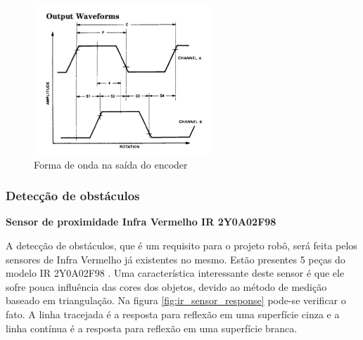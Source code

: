 \begin{figure}[H]
\centering
\includegraphics[width=0.6\textwidth]{./figuras/heds9700.png}
\caption{Forma de onda na saída do encoder}
\label{fig:heds9700}
\end{figure}

\subsubsection{Detecção de obstáculos}

\textbf{Sensor de proximidade Infra Vermelho IR 2Y0A02F98}

A detecção de obstáculos, que é um requisito para o projeto robô, será feita pelos sensores de Infra Vermelho já existentes no mesmo. Estão presentes 5 peças do modelo IR 2Y0A02F98 \cite{ir_sensor}. Uma característica interessante deste sensor é que ele sofre pouca influência das cores dos objetos, devido ao método de medição baseado em triangulação. Na figura \ref{fig:ir_sensor_response} pode-se verificar o fato. A linha tracejada é a resposta para reflexão em uma superfície cinza e a linha contínua é a resposta para reflexão em uma superfície branca.

